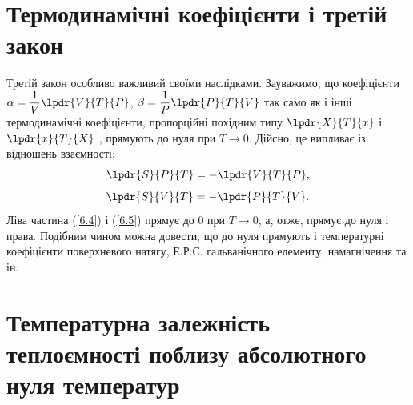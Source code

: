 \section{Термодинамічні коефіцієнти і третій закон}


Третій закон особливо важливий своїми наслідками. Зауважимо, що коефіцієнти $\alpha = \dfrac{1}{V}\lpdr{V}{T}{P}$, $\beta = \dfrac{1}{P}\lpdr{P}{T}{V}$ так само як і інші термодинамічні коефіцієнти, пропорційні похідним типу $\lpdr{X}{T}{x}$ і $\lpdr{x}{T}{X}$ , прямують до нуля при $T\rightarrow0$. Дійсно, це випливає із відношень взаємності:
\begin{equation}\label{6.4}
	\lpdr{S}{P}{T}=-\lpdr{V}{T}{P},
\end{equation}
\begin{equation}\label{6.5}
	\lpdr{S}{V}{T}=-\lpdr{P}{T}{V}.
\end{equation}
Ліва частина (\ref{6.4}) і (\ref{6.5})  прямує до $0$ при $T\rightarrow0$, а, отже, прямує до нуля і права. Подібним чином можна довести, що до нуля прямують і температурні коефіцієнти поверхневого натягу, Е.Р.С. гальванічного елементу, намагнічення та ін.


\section{Температурна залежність теплоємності поблизу абсолютного нуля температур}



